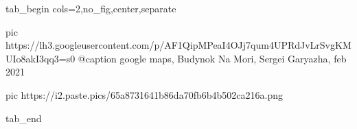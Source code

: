  
 
 
 
 


\ifcmt
  tab_begin cols=2,no_fig,center,separate

     pic https://lh3.googleusercontent.com/p/AF1QipMPeaI4OJj7qum4UPRdJvLrSvgKMUIo8akI3qq3=s0
		 @caption google maps, Budynok Na Mori, Sergei Garyazha, feb 2021

     pic https://i2.paste.pics/65a8731641b86da70fb6b4b502ca216a.png

  tab_end
\fi
